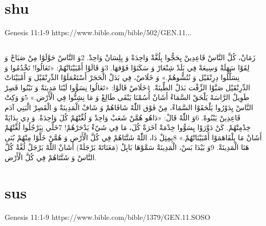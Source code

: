 \documentclass[12pt,fleqn,titlepage,twoside,a4paper]{book}
\begin{document}
\section{shu}

Genesis 11:1-9 https://www.bible.com/bible/502/GEN.11...

\begin{arab}[utf]
\section*{}

زَمَانْ، كُلَّ النَّاسْ قَاعِدِينْ يِحَجُّوا بِلُغَّةْ وَاحِدَةْ وَ بِلِسَانْ وَاحِدْ. 2وَ النَّاسْ حَوَّلَوْا مِنْ صَبَاحْ وَ لِقَوْا سَهَلَةْ وَسِيعَةْ فِي بَلَدْ شِنْعَارْ وَ سَكَنَوْا فَوْقهَا. 3وَ قَالَوْا أَمْبَيْنَاتْهُمْ: «تَعَالُوا! نَخْدُمُوا وَ نِسَلُّلُوا دِرِنْقَيْل وَ نُتُشُّوهُمْ.»
وَ خَلَاصْ، فِي بَدَلْ الْحَجَرْ أَسْتَعْمَلَوْا الدِّرِنْقَيْل وَ أَمْبَيْنَاتْ الدِّرِنْقَيْل صَبَّوْا الزِّفْت بَدَلْ الطِّينَةْ. 4خَلَاصْ قَالَوْا: «تَعَالُوا نِسَوُّوا لَيْنَا مَدِينَةْ وَ نَبْنُوا قَصِرْ طَوِيلْ الرَّاسَهْ يَلْحَقْ السَّمَاءْ أَشَانْ أُسُمْنَا يَبْقَى طَالِعْ وَ مَا نِشِتُّوا فِي الْأَرْض.»
5وَ وَكِتْ النَّاسْ يِدَوْرُوا يَلْحَقَوْا السَّمَاءْ، مِنْ فَوْق اللّٰهْ شَافَاهُمْ وَ شَافْ الْمَدِينَةْ وَ الْقَصِرْ الْبَنِي آدَم قَاعِدِينْ يَبْنُوهْ. 6وَ اللّٰهْ قَالْ: «دَاهُو هُمَّنْ شَعَبْ وَاحِدْ وَ لُغِّتْهُمْ كُلَ وَاحِدَةْ. وَ دِي بِدَايَةْ خِدْمِتْهُمْ. كَنْ دَوَّرَوْا يِسَوُّوا خِدْمَةْ آخَرَةْ كُلَ، مَا فِي شَيّءْ يَدْحَرْهُمْ! 7خَلِّي نِبَرْجُلُوا لُغِّتْهُمْ أَشَانْ مَا يِلْفَاهَمَوْا أَمْبَيْنَاتْهُمْ.»
8بِمِثِلْ دَا، اللّٰهْ شَتَّتَاهُمْ فِي كُلَّ الْأَرْض وَ هُمَّنْ خَلَّوْا مِنْهُمْ بُنَى هَنَا الْمَدِينَةْ. 9وَ بَيْدَا بَسْ، الْمَدِينَةْ سَمَّوْهَا بَابِلْ (مَعَنَاتَهْ بَرْجَلَةْ) أَشَانْ اللّٰهْ بَرْجَلْ لُغَّةْ كُلَّ النَّاسْ وَ شَتَّتَاهُمْ فِي كُلَّ الْأَرْض.
\end{arab}

\section{sus}

Genesis 11:1-9 https://www.bible.com/bible/1379/GEN.11.SOSO
\end{document}
